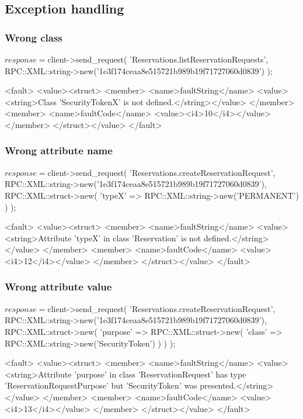 \newpage
\subsection{Exception handling}
\subsubsection{Wrong class}
\begin{PerlCmd}
$response = $client->send_request(
    'Reservations.listReservationRequests',
    RPC::XML::string->new('1e3f174ceaa8e515721b989b19f71727060d0839')
);
\end{PerlCmd}
\begin{PerlResponse}
<fault>
  <value><struct>
    <member>
      <name>faultString</name>
      <value><string>Class 'SecurityTokenX' is not defined.</string></value>
    </member>
    <member>
      <name>faultCode</name>
      <value><i4>10</i4></value>
    </member>
  </struct></value>
</fault>
\end{PerlResponse}

\subsubsection{Wrong attribute name}
\begin{PerlCmd}
$response = $client->send_request(
    'Reservations.createReservationRequest',
    RPC::XML::string->new('1e3f174ceaa8e515721b989b19f71727060d0839'),
    RPC::XML::struct->new(
        'typeX' => RPC::XML::string->new('PERMANENT')
    )
);
\end{PerlCmd}
\begin{PerlResponse}
<fault>
  <value><struct>
    <member>
      <name>faultString</name>
      <value><string>Attribute 'typeX' in class 'Reservation' is not defined.</string></value>
    </member>
    <member>
      <name>faultCode</name>
      <value><i4>12</i4></value>
    </member>
  </struct></value>
</fault>
\end{PerlResponse}

\subsubsection{Wrong attribute value}
\begin{PerlCmd}
$response = $client->send_request(
    'Reservations.createReservationRequest',
    RPC::XML::string->new('1e3f174ceaa8e515721b989b19f71727060d0839'),
    RPC::XML::struct->new(
        'purpose' => RPC::XML::struct->new(
            'class' => RPC::XML::string->new('SecurityToken')
        )
    )
);
\end{PerlCmd}
\begin{PerlResponse}
<fault>
  <value><struct>
    <member>
      <name>faultString</name>
      <value><string>Attribute 'purpose' in class 'ReservationRequest' has type
          'ReservationRequestPurpose' but 'SecurityToken' was presented.</string></value>
    </member>
    <member>
      <name>faultCode</name>
      <value><i4>13</i4></value>
    </member>
  </struct></value>
</fault>
\end{PerlResponse}

